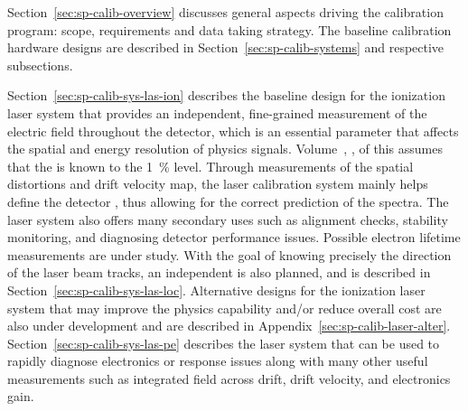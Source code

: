Section~\ref{sec:sp-calib-overview} discusses general aspects driving the calibration program: scope, requirements and data taking strategy.
The baseline calibration hardware designs are described in Section~\ref{sec:sp-calib-systems} and respective subsections. 

Section~\ref{sec:sp-calib-sys-las-ion} describes the baseline design for the ionization laser system that provides an independent, fine-grained measurement of the electric field throughout the detector, which is an essential parameter that affects the spatial and energy resolution of physics signals. 
Volume~\volnumberphysics{}, \voltitlephysics{},  of this  
assumes that the  is known to the \SI{1}{\%} level. Through measurements of the spatial distortions and drift velocity map, the laser calibration system mainly helps define the detector , thus allowing for the correct prediction of the  spectra. The laser system also offers many secondary uses such as alignment checks, stability monitoring, and diagnosing detector performance issues. 
Possible electron lifetime measurements are under study. 
With the goal of knowing precisely the direction of the laser beam tracks, an independent 
is also planned, and is described in Section~\ref{sec:sp-calib-sys-las-loc}.
Alternative designs for the ionization laser system that may improve the physics capability and/or reduce overall cost are also under development and are described in Appendix~\ref{sec:sp-calib-laser-alter}. %
Section~\ref{sec:sp-calib-sys-las-pe} describes the \phel laser system that can be used to rapidly diagnose electronics or  response issues along with many other useful measurements such as integrated field across drift, drift velocity, and electronics gain. 

